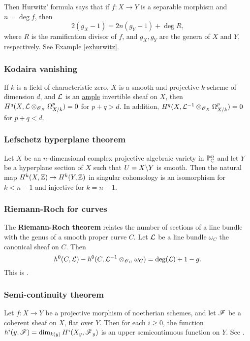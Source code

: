 \documentclass[11pt, english]{article}
\begin{document}
Then Hurwitz' formula says that if $f:X \to Y$ is a separable morphism and $n= \deg f$, then
\[
2(g_X-1) = 2n(g_Y-1) + \deg R,
\]
where $R$ is the ramification divisor of $f$, and $g_X,g_Y$ are the genera of $X$ and $Y$, respectively. See Example \ref{exhurwitz}. 

\subsubsection{Kodaira vanishing}
\label{kodairavanishing}
If $k$ is a field of characteristic zero, $X$ is a smooth and projective $k$-scheme of dimension $d$, and $\mathcal{L}$ is an \hyperref[amplelinebundle]{ample} invertible sheaf on $X$, then ${H^q(X,{\mathcal{L} \otimes_{\operatorname{\mathscr{O}}_X} \Omega^p_{X/k}})=0}$ for $p+q > d$. In addition, $H^q(X,\mathcal{L}^{-1} \otimes_{\operatorname{\mathscr{O}}_X} \Omega_{X/k}^p)=0$ for $p+q < d$. 

\subsubsection{Lefschetz hyperplane theorem}
\label{lefschetz} 
Let $X$ be an $n$-dimensional complex projective algebraic variety in $\mathbb{P}_{\mathbb{C}}^n$ and let $Y$ be a hyperplane section of $X$ such that $U=X \backslash Y$ is smooth. Then the natural map $H^k(X,\mathbb{Z}) \to H^k(Y,\mathbb{Z})$ in singular cohomology is an isomorphism for $k<n-1$ and injective for $k=n-1$.

\subsubsection{Riemann-Roch for curves}
\label{riemannroch}

The \textbf{Riemann-Roch theorem} relates the number of sections of a line bundle with the genus of a smooth proper curve $C$. Let $\mathcal{L}$ be a line bundle $\omega_C$ the canonical sheaf on $C$. Then
\[
h^0(C,\mathcal{L}) - h^0(C, \mathcal{L}^{-1} \otimes_{\operatorname{\mathscr{O}}_{C}} \omega_C) = \deg(\mathcal{L}) +1 -g.
\]
This is \cite[Theorem IV.1.3]{hartshorne}.

\subsubsection{Semi-continuity theorem}
\label{semicontinuity}

Let $f:X \to Y$ be a projective morphism of noetherian schemes, and let $\operatorname{\mathscr{F}}$ be a coherent sheaf on $X$, flat over $Y$. Then for each $i \geq 0$, the function $h^i(y,\operatorname{\mathscr{F}})=\dim_{k(y)} H^i(X_y,\operatorname{\mathscr{F}}_y)$ is an upper semicontinuous function on $Y$. See \cite[Chapter III, Theorem 12.8]{hartshorne}.
\end{document}
